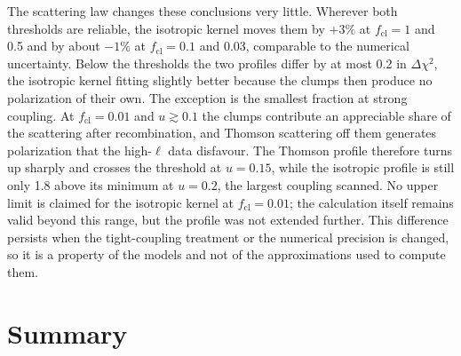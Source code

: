 \documentclass[11pt,a4paper]{article}
\newcommand{\cl}{\mathrm{cl}}
\newcommand{\dchi}{\Delta\chi^2}
\begin{document}
The scattering law changes these conclusions very little. Wherever both thresholds are reliable, the isotropic kernel moves them by $+3\%$ at $f_\cl = 1$ and 0.5 and by about $-1\%$ at $f_\cl = 0.1$ and 0.03, comparable to the numerical uncertainty. Below the thresholds the two profiles differ by at most 0.2 in $\dchi$, the isotropic kernel fitting slightly better because the clumps then produce no polarization of their own. The exception is the smallest fraction at strong coupling. At $f_\cl = 0.01$ and $u \gtrsim 0.1$ the clumps contribute an appreciable share of the scattering after recombination, and Thomson scattering off them generates polarization that the high-$\ell$ data disfavour. The Thomson profile therefore turns up sharply and crosses the threshold at $u = 0.15$, while the isotropic profile is still only 1.8 above its minimum at $u = 0.2$, the largest coupling scanned. No upper limit is claimed for the isotropic kernel at $f_\cl = 0.01$; the calculation itself remains valid beyond this range, but the profile was not extended further. This difference persists when the tight-coupling treatment or the numerical precision is changed, so it is a property of the models and not of the approximations used to compute them.

\section{Summary}
\end{document}
